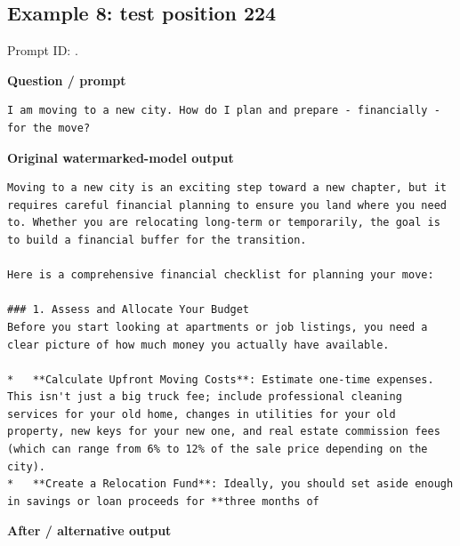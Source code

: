 \subsection{Example 8: test position
224}\label{record-docs-watermarking-qualitative-text-latent-vanilla-md-example-8-test-position-224}

Prompt ID:
\texttt{}.

\textbf{Question / prompt}

\begin{Verbatim}
I am moving to a new city. How do I plan and prepare - financially - for the move?
\end{Verbatim}

\textbf{Original watermarked-model output}

\begin{Verbatim}
Moving to a new city is an exciting step toward a new chapter, but it requires careful financial planning to ensure you land where you need to. Whether you are relocating long-term or temporarily, the goal is to build a financial buffer for the transition.

Here is a comprehensive financial checklist for planning your move:

### 1. Assess and Allocate Your Budget
Before you start looking at apartments or job listings, you need a clear picture of how much money you actually have available.

*   **Calculate Upfront Moving Costs**: Estimate one-time expenses. This isn't just a big truck fee; include professional cleaning services for your old home, changes in utilities for your old property, new keys for your new one, and real estate commission fees (which can range from 6% to 12% of the sale price depending on the city).
*   **Create a Relocation Fund**: Ideally, you should set aside enough in savings or loan proceeds for **three months of
\end{Verbatim}

\textbf{After / alternative output}

